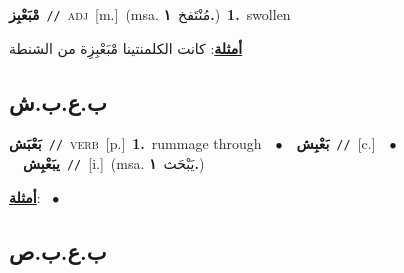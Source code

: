 \documentclass[10pt,a4paper,twoside]{article} %
\begin{document}
\begin{multicols}{2}
{\setlength\topsep{0pt}\textbf{\foreignlanguage{arabic}{مْبَعْبِز}}\ {\color{gray}\texttt{//}\color{black}}\ \textsc{adj}\ [m.]\ \color{gray}(msa. \foreignlanguage{arabic}{مُنْتَفخ}~\foreignlanguage{arabic}{\textbf{١.}})\color{black}\ \textbf{1.}~swollen\  \begin{flushright}\color{gray}\foreignlanguage{arabic}{\textbf{\underline{\foreignlanguage{arabic}{أمثلة}}}: كانت الكلمنتينا مْبَعْبِزِة من الشنطة}\end{flushright}\color{black}} \vspace{2mm}

\vspace{-3mm}
\subsection*{\color{blue}\foreignlanguage{arabic}{ب.ع.ب.ش}\color{blue}{}} 

{\setlength\topsep{0pt}\textbf{\foreignlanguage{arabic}{بَعْبَش}}\ {\color{gray}\texttt{//}\color{black}}\ \textsc{verb}\ [p.]\ \textbf{1.}~rummage through\ \ $\bullet$\ \ \setlength\topsep{0pt}\textbf{\foreignlanguage{arabic}{بَعْبِش}}\ {\color{gray}\texttt{//}\color{black}}\ [c.]\ \ $\bullet$\ \ \setlength\topsep{0pt}\textbf{\foreignlanguage{arabic}{يبَعْبِش}}\ {\color{gray}\texttt{//}\color{black}}\ [i.]\ \color{gray}(msa. \foreignlanguage{arabic}{يَبْحَث}~\foreignlanguage{arabic}{\textbf{١.}})\color{black}\  \begin{flushright}\color{gray}\foreignlanguage{arabic}{\textbf{\underline{\foreignlanguage{arabic}{أمثلة}}}: \ $\bullet$\ \  }\end{flushright}\color{black}} \vspace{2mm}

\vspace{-3mm}
\subsection*{\color{blue}\foreignlanguage{arabic}{ب.ع.ب.ص}\color{blue}{}} 


\end{multicols}
\end{document}

